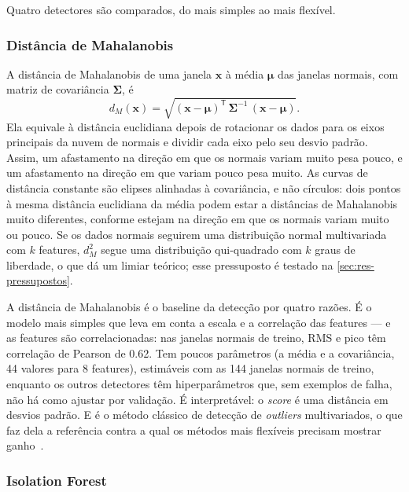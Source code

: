 Quatro detectores são comparados, do mais simples ao mais flexível.

\subsubsection{Distância de Mahalanobis}

A distância de Mahalanobis de uma janela $\mathbf{x}$ à média $\boldsymbol{\mu}$
das janelas normais, com matriz de covariância $\boldsymbol{\Sigma}$,
é~\cite{chandola2009}
\begin{equation}
  d_M(\mathbf{x}) = \sqrt{(\mathbf{x} - \boldsymbol{\mu})^{\mathsf{T}}\,
  \boldsymbol{\Sigma}^{-1}\,(\mathbf{x} - \boldsymbol{\mu})}.
\end{equation}
Ela equivale à distância euclidiana depois de rotacionar os dados para os eixos
principais da nuvem de normais e dividir cada eixo pelo seu desvio padrão. Assim,
um afastamento na direção em que os normais variam muito pesa pouco, e um
afastamento na direção em que variam pouco pesa muito. As curvas de distância
constante são elipses alinhadas à covariância, e não círculos: dois pontos à
mesma distância euclidiana da média podem estar a distâncias de Mahalanobis muito
diferentes, conforme estejam na direção em que os normais variam muito ou pouco.
Se os dados normais seguirem
uma distribuição normal multivariada com $k$ features, $d_M^2$ segue uma
distribuição qui-quadrado com $k$ graus de liberdade, o que dá um limiar
teórico; esse pressuposto é testado na
\autoref{sec:res-pressupostos}.

A distância de Mahalanobis é o baseline da detecção por quatro razões. É o modelo
mais simples que leva em conta a escala e a correlação das features --- e as
features são correlacionadas: nas janelas normais de treino, RMS e pico têm
correlação de Pearson de \num{0.62}. Tem poucos parâmetros (a média e a covariância, 44 valores para
8 features), estimáveis com as 144 janelas normais de treino, enquanto os outros
detectores têm hiperparâmetros que, sem exemplos de falha, não há como ajustar
por validação. É interpretável: o \emph{score} é uma distância em desvios padrão.
E é o método clássico de detecção de \emph{outliers} multivariados, o que faz dela
a referência contra a qual os métodos mais flexíveis precisam mostrar
ganho~\cite{chandola2009}.

\subsubsection{Isolation Forest}


